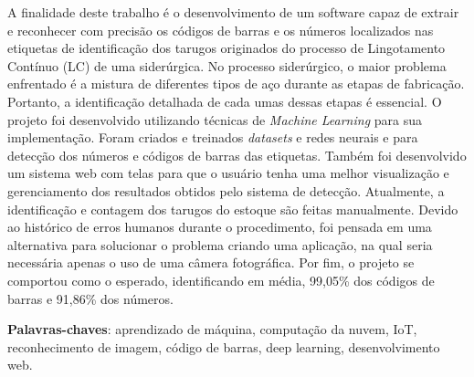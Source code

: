 \documentclass[
	12pt,				%
	oneside,
	a4paper,			%
	english,			%
	brazil				%
	]{abntex2ufop} %
\begin{document}

\setlength{\absparsep}{18pt} %
\begin{resumo}
 \noindent
A finalidade deste trabalho é o desenvolvimento de um software capaz de extrair e reconhecer com precisão os códigos de barras e os números localizados nas etiquetas de identificação dos tarugos originados do processo de Lingotamento Contínuo (LC) de uma siderúrgica. 
%
No processo siderúrgico, o maior problema enfrentado é a mistura de diferentes tipos de aço durante as etapas de fabricação. Portanto, a identificação detalhada de cada umas dessas etapas é essencial. 
%
O projeto foi desenvolvido utilizando técnicas de \textit{Machine Learning} para sua implementação. Foram criados e treinados \textit{datasets} e redes neurais e para detecção dos números e códigos de barras das etiquetas. 
%
Também foi desenvolvido um sistema web com telas para que o usuário tenha uma melhor visualização e gerenciamento dos resultados obtidos pelo sistema de detecção. 
%
Atualmente, a identificação e contagem dos tarugos do estoque são feitas manualmente. 
Devido ao histórico de erros humanos durante o procedimento, foi pensada em uma alternativa para solucionar o problema criando uma aplicação, na qual seria necessária apenas o uso de uma câmera fotográfica.
%
Por fim, o projeto se comportou como o esperado, identificando em média, 99,05\% dos códigos de barras e 91,86\% dos números. 

 \textbf{Palavras-chaves}: aprendizado de máquina, computação da nuvem, IoT, reconhecimento de imagem, código de barras, deep learning, desenvolvimento web.
\end{resumo}
\end{document}
